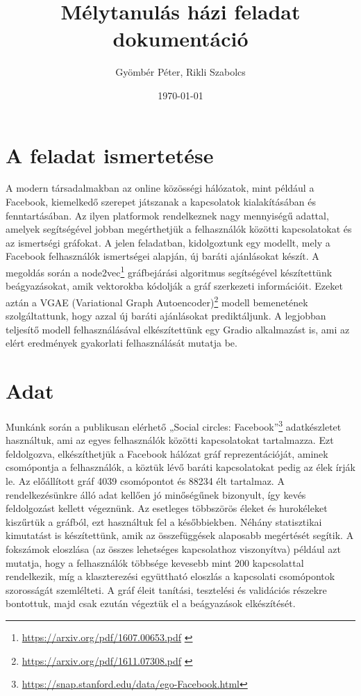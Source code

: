 \documentclass{article}
\title{\textbf{Mélytanulás házi feladat dokumentáció}}
\author{Gyömbér Péter, Rikli Szabolcs}
\date{\today}
\begin{document}
	\maketitle
	\newpage
	
	\tableofcontents
	\newpage
	
	\section{A feladat ismertetése}
	
		\par A modern társadalmakban az online közösségi hálózatok, mint például a Facebook, kiemelkedő szerepet játszanak a kapcsolatok kialakításában és fenntartásában. Az ilyen platformok rendelkeznek nagy mennyiségű adattal, amelyek segítségével jobban megérthetjük a felhasználók közötti kapcsolatokat és az ismertségi gráfokat. A jelen feladatban, kidolgoztunk egy modellt, mely a Facebook felhasználók ismertségei alapján, új baráti ajánlásokat készít. A megoldás során a node2vec\footnote{\url{https://arxiv.org/pdf/1607.00653.pdf} \label{node2vec}} gráfbejárási algoritmus segítségével készítettünk beágyazásokat, amik vektorokba kódolják a gráf szerkezeti információit. Ezeket aztán a VGAE (Variational Graph Autoencoder)\footnote{\url{https://arxiv.org/pdf/1611.07308.pdf} \label{vgae}} modell bemenetének szolgáltattunk, hogy azzal új baráti ajánlásokat prediktáljunk. A legjobban teljesítő modell felhasználásával elkészítettünk egy Gradio alkalmazást is, ami az elért eredmények gyakorlati felhasználását mutatja be. 
	
	\section{Adat}
	
		\par Munkánk során a publikusan elérhető „Social circles: Facebook”\footnote{\url{https://snap.stanford.edu/data/ego-Facebook.html}} adatkészletet használtuk, ami az egyes felhasználók közötti kapcsolatokat tartalmazza. Ezt feldolgozva, elkészíthetjük a Facebook hálózat gráf reprezentációját, aminek csomópontja a felhasználók, a köztük lévő baráti kapcsolatokat pedig az élek írják le. Az előállított gráf 4039 csomópontot és 88234 élt tartalmaz. A rendelkezésünkre álló adat kellően jó minőségűnek bizonyult, így kevés feldolgozást kellett végeznünk. Az esetleges többszörös éleket és hurokéleket kiszűrtük a gráfból, ezt használtuk fel a későbbiekben. Néhány statisztikai kimutatást is készítettünk, amik az összefüggések alaposabb megértését segítik. A fokszámok eloszlása (az összes lehetséges kapcsolathoz viszonyítva) például azt mutatja, hogy a felhasználók többsége kevesebb mint 200 kapcsolattal rendelkezik, míg a klaszterezési együttható eloszlás a kapcsolati csomópontok szorosságát szemlélteti. A gráf éleit tanítási, tesztelési és validációs részekre bontottuk, majd csak ezután végeztük el a beágyazások elkészítését.
		
\end{document}
